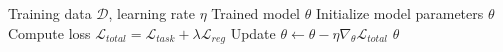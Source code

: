 
\begin{algorithm}[h]
\caption{Training Procedure}
\label{alg:training}
\begin{algorithmic}[1]
\Require Training data $\mathcal{D}$, learning rate $\eta$
\Ensure Trained model $\theta$
\State Initialize model parameters $\theta$
        \State Compute loss $\mathcal{L}_{total} = \mathcal{L}_{task} + \lambda \mathcal{L}_{reg}$
        \State Update $\theta \gets \theta - \eta \nabla_\theta \mathcal{L}_{total}$
    \EndFor
\EndFor
\State \Return $\theta$
\end{algorithmic}
\end{algorithm}

